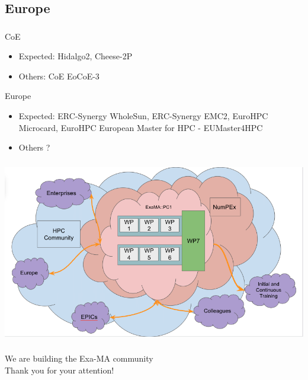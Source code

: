 \subsection{Europe}
\begin{frame}
  \frametitle{\insertsectionhead}
  \framesubtitle{\insertsubsectionhead}
  \begin{alertblock}{CoE}
    \begin{itemize}
      \item Expected: Hidalgo2, Cheese-2P
      \item Others: CoE	EoCoE-3
    \end{itemize}
  \end{alertblock}

  \begin{alertblock}{Europe}
    \begin{itemize}
      \item Expected: ERC-Synergy WholeSun, ERC-Synergy	EMC2, EuroHPC	Microcard, EuroHPC	European Master for HPC - EUMaster4HPC	
      \item Others ?
    \end{itemize}
  \end{alertblock}
\end{frame}

\begin{frame}[plain]
  \frametitle{}
  \framesubtitle{}
\begin{center}
  \includegraphics[width=.9\linewidth]{../../figures/exama-relations.png}
\end{center}
  
\end{frame}



\begin{frame}
  \frametitle{}
  \framesubtitle{}

  \begin{center}
    \LARGE We are building the Exa-MA community \\[1cm]

    Thank you for your attention!
  \end{center}
  
  

\end{frame}

